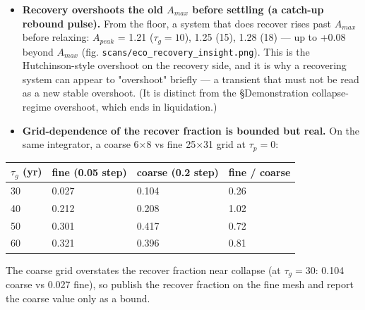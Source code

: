 \documentclass[11pt]{article}
\begin{document}
\begin{itemize}
\item \textbf{Recovery overshoots the old $A_{max}$ before settling (a catch-up rebound pulse).} From the floor, a system that does recover rises past $A_{max}$ before relaxing: $A_{peak}$ = 1.21 ($\tau{}_{g}=10$), 1.25 (15), 1.28 (18) — up to +0.08 beyond $A_{max}$ (fig. \texttt{scans/eco\_recovery\_insight.png}). This is the Hutchinson-style overshoot on the recovery side, and it is why a recovering system can appear to "overshoot" briefly — a transient that must not be read as a new stable overshoot. (It is distinct from the §Demonstration collapse-regime overshoot, which ends in liquidation.)
\item \textbf{Grid-dependence of the recover fraction is bounded but real.} On the same integrator, a coarse 6\ensuremath{\times{}}8 vs fine 25\ensuremath{\times{}}31 grid at $\tau{}_{p}=0$:
\end{itemize}

\begin{table}[htbp]
\centering
\small
\begin{tabular}{llll}
\toprule
$\tau{}_{g}$ (yr) & fine (0.05 step) & coarse (0.2 step) & fine / coarse \\
\midrule
30 & 0.027 & 0.104 & 0.26 \\
40 & 0.212 & 0.208 & 1.02 \\
50 & 0.301 & 0.417 & 0.72 \\
60 & 0.321 & 0.396 & 0.81 \\
\bottomrule
\end{tabular}
\end{table}

The coarse grid overstates the recover fraction near collapse (at $\tau{}_{g}=30$: 0.104 coarse vs 0.027 fine), so publish the recover fraction on the fine mesh and report the coarse value only as a bound.
\end{document}
